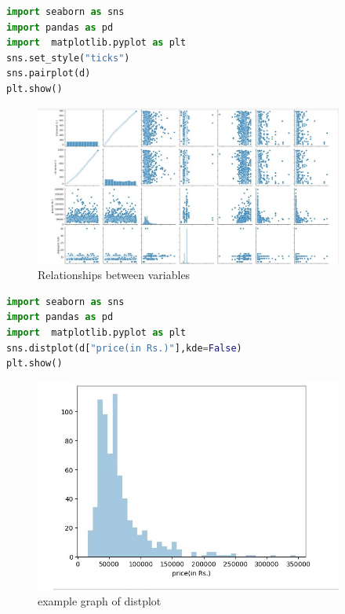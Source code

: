 \begin{lstlisting}[language=Python]
import seaborn as sns
import pandas as pd
import  matplotlib.pyplot as plt
sns.set_style("ticks")
sns.pairplot(d)
plt.show()
\end{lstlisting}
\begin{figure}[h]
\centering
 \footnotesize
 \includegraphics[width=4in]{11.png}
\caption{Relationships between variables}
\label{fig:dunnhalftone}
\end{figure} 
\begin{lstlisting}[language=Python]
import seaborn as sns
import pandas as pd
import  matplotlib.pyplot as plt
sns.distplot(d["price(in Rs.)"],kde=False)
plt.show()
\end{lstlisting}
\begin{figure}[h]
\centering
 \footnotesize
 \includegraphics[width=4in]{12.png}
\caption{example graph of distplot}
\label{fig:dunnhalftone}
\end{figure} 

